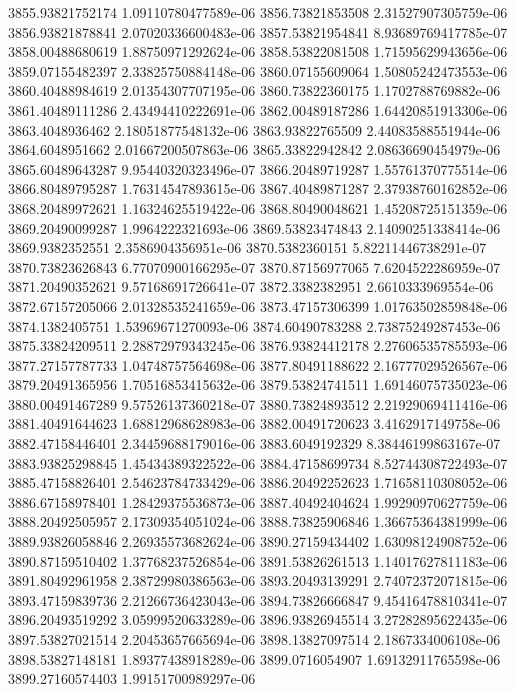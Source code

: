 {3855.93821752174 1.09110780477589e-06
3856.73821853508 2.31527907305759e-06
3856.93821878841 2.07020336600483e-06
3857.53821954841 8.93689769417785e-07
3858.00488680619 1.88750971292624e-06
3858.53822081508 1.71595629943656e-06
3859.07155482397 2.33825750884148e-06
3860.07155609064 1.50805242473553e-06
3860.40488984619 2.01354307707195e-06
3860.73822360175 1.1702788769882e-06
3861.40489111286 2.43494410222691e-06
3862.00489187286 1.64420851913306e-06
3863.4048936462 2.18051877548132e-06
3863.93822765509 2.44083588551944e-06
3864.6048951662 2.01667200507863e-06
3865.33822942842 2.08636690454979e-06
3865.60489643287 9.95440320323496e-07
3866.20489719287 1.55761370775514e-06
3866.80489795287 1.76314547893615e-06
3867.40489871287 2.37938760162852e-06
3868.20489972621 1.16324625519422e-06
3868.80490048621 1.45208725151359e-06
3869.20490099287 1.9964222321693e-06
3869.53823474843 2.14090251338414e-06
3869.9382352551 2.3586904356951e-06
3870.5382360151 5.82211446738291e-07
3870.73823626843 6.77070900166295e-07
3870.87156977065 7.6204522286959e-07
3871.20490352621 9.57168691726641e-07
3872.3382382951 2.6610333969554e-06
3872.67157205066 2.01328535241659e-06
3873.47157306399 1.01763502859848e-06
3874.1382405751 1.53969671270093e-06
3874.60490783288 2.73875249287453e-06
3875.33824209511 2.28872979343245e-06
3876.93824412178 2.27606535785593e-06
3877.27157787733 1.04748757564698e-06
3877.80491188622 2.16777029526567e-06
3879.20491365956 1.70516853415632e-06
3879.53824741511 1.69146075735023e-06
3880.00491467289 9.57526137360218e-07
3880.73824893512 2.21929069411416e-06
3881.40491644623 1.68812968628983e-06
3882.00491720623 3.4162917149758e-06
3882.47158446401 2.34459688179016e-06
3883.6049192329 8.38446199863167e-07
3883.93825298845 1.45434389322522e-06
3884.47158699734 8.52744308722493e-07
3885.47158826401 2.54623784733429e-06
3886.20492252623 1.71658110308052e-06
3886.67158978401 1.28429375536873e-06
3887.40492404624 1.99290970627759e-06
3888.20492505957 2.17309354051024e-06
3888.73825906846 1.36675364381999e-06
3889.93826058846 2.26935573682624e-06
3890.27159434402 1.63098124908752e-06
3890.87159510402 1.37768237526854e-06
3891.53826261513 1.14017627811183e-06
3891.80492961958 2.38729980386563e-06
3893.20493139291 2.74072372071815e-06
3893.47159839736 2.21266736423043e-06
3894.73826666847 9.45416478810341e-07
3896.20493519292 3.05999520633289e-06
3896.93826945514 3.27282895622435e-06
3897.53827021514 2.20453657665694e-06
3898.13827097514 2.1867334006108e-06
3898.53827148181 1.89377438918289e-06
3899.0716054907 1.69132911765598e-06
3899.27160574403 1.99151700989297e-06
}
